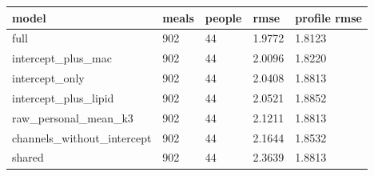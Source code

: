 {\footnotesize\setlength{\tabcolsep}{3pt}
\begin{longtable}{lllll}
\toprule
\textbf{model} & \textbf{meals} & \textbf{people} & \textbf{rmse} & \textbf{profile rmse} \\
\midrule
\endhead
full & 902 & 44 & 1.9772 & 1.8123 \\
intercept\_plus\_mac & 902 & 44 & 2.0096 & 1.8220 \\
intercept\_only & 902 & 44 & 2.0408 & 1.8813 \\
intercept\_plus\_lipid & 902 & 44 & 2.0521 & 1.8852 \\
raw\_personal\_mean\_k3 & 902 & 44 & 2.1211 & 1.8813 \\
channels\_without\_intercept & 902 & 44 & 2.1644 & 1.8532 \\
shared & 902 & 44 & 2.3639 & 1.8813 \\
\bottomrule
\end{longtable}}
